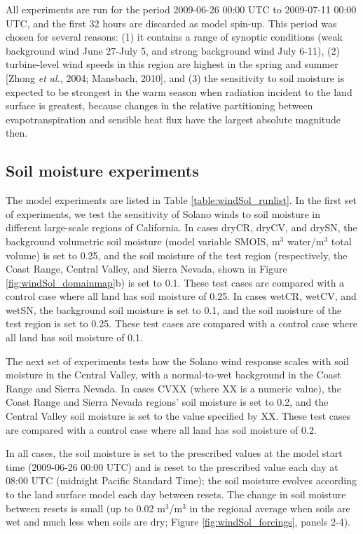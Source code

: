 All experiments are run for the period 2009-06-26 00:00 UTC to 2009-07-11 00:00 UTC, and the first 32 hours are discarded as model spin-up.  This period was chosen for several reasons: (1) it contains a range of synoptic conditions (weak background wind June 27-July 5, and strong background wind July 6-11), (2) turbine-level wind speeds in this region are highest in the spring and summer [Zhong \textit{et al.}, 2004; Mansbach, 2010], and (3) the sensitivity to soil moisture is expected to be strongest in the warm season when radiation incident to the land surface is greatest, because changes in the relative partitioning between evapotranspiration and sensible heat flux have the largest absolute magnitude then.

\subsection{Soil moisture experiments}

The model experiments are listed in Table \ref{table:windSol_runlist}.  In the first set of experiments, we test the sensitivity of Solano winds to soil moisture in different large-scale regions of California.  In cases dryCR, dryCV, and drySN, the background volumetric soil moisture (model variable SMOIS, m$^3$ water/m$^3$ total volume) is set to 0.25, and the soil moisture of the test region (respectively, the Coast Range, Central Valley, and Sierra Nevada, shown in Figure \ref{fig:windSol_domainmap}b) is set to 0.1.  These test cases are compared with a control case where all land has soil moisture of 0.25.  In cases wetCR, wetCV, and wetSN, the background soil moisture is set to 0.1, and the soil moisture of the test region is set to 0.25.  These test cases are compared with a control case where all land has soil moisture of 0.1.

The next set of experiments tests how the Solano wind response scales with soil moisture in the Central Valley, with a normal-to-wet background in the Coast Range and Sierra Nevada.  In cases CVXX (where XX is a numeric value), the Coast Range and Sierra Nevada regions' soil moisture is set to 0.2, and the Central Valley soil moisture is set to the value specified by XX.  These test cases are compared with a control case where all land has soil moisture of 0.2.

In all cases, the soil moisture is set to the prescribed values at the model start time (2009-06-26 00:00 UTC) and is reset to the prescribed value each day at 08:00 UTC (midnight Pacific Standard Time); the soil moisture evolves according to the land surface model each day between resets.  The change in soil moisture between resets is small (up to 0.02 m$^3$/m$^3$ in the regional average when soils are wet and much less when soils are dry; Figure \ref{fig:windSol_forcings}, panels 2-4).

